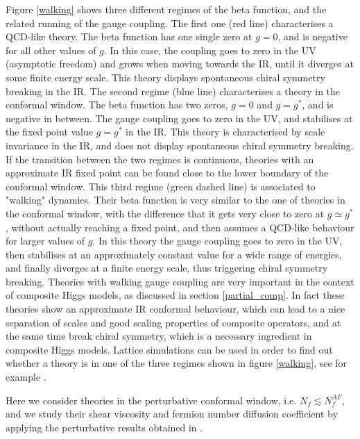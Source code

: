 Figure \ref{walking} shows three different regimes of the beta function, and the related running of the gauge coupling. The first one (red line) characterises a QCD-like theory. The beta function has one single zero at $g=0$, and is negative for all other values of $g$. In this case, the coupling goes to zero in the UV (asymptotic freedom) and grows when moving towards the IR, until it diverges at some finite energy scale. 
This theory displays spontaneous chiral symmetry breaking in the IR. The second regime (blue line) characterises a theory in the conformal window. The beta function has two zeros, $g=0$ and $g=g^*$, and is negative in between. The gauge coupling goes to zero in the UV, and stabilises at the fixed point value $g=g^*$ in the IR. 
This theory is characterised by scale invariance in the IR, and does not display spontaneous chiral symmetry breaking. 
If the transition between the two regimes is continuous, theories with an approximate IR fixed point can be found close to the lower boundary of the conformal window. 
This third regime (green dashed line) is associated to "walking" dynamics.
Their beta function is very similar to the one of theories in the conformal window, with the difference that it gets very close to zero at $g\simeq g^*$, without actually reaching a fixed point, and then assumes a QCD-like behaviour for larger values of $g$. In this theory the gauge coupling goes to zero in the UV, then stabilises at an approximately constant value for a wide range of energies, and finally diverges at a finite energy scale, thus triggering chiral symmetry breaking. 
Theories with walking gauge coupling are very important in the context of composite Higgs models, as discussed in section \ref{partial_comp}. In fact these theories show an approximate IR conformal behaviour, which can lead to a nice separation of scales and good scaling properties of composite operators, and at the same time break chiral symmetry, which is a necessary ingredient in composite Higgs models.
Lattice simulations can be used in order to find out whether a theory is in one of the three regimes shown in figure \ref{walking}, see for example \cite{Hietanen:2008mr,Hansen:2017ejh}.

Here we consider theories in the perturbative conformal window, i.e. $N_f \lesssim N_f^{AF}$, and we study their shear viscosity and fermion number diffusion coefficient by applying the perturbative results obtained in \cite{Arnold:2000dr}.


